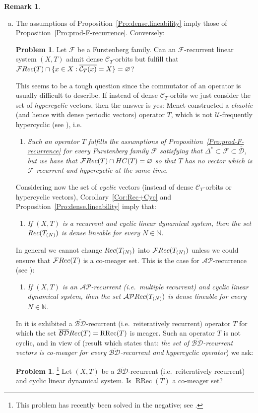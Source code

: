 \documentclass[openright,11pt]{article}
\theoremstyle{plain}
\theoremstyle{definition}
\newtheorem{remark}[theorem]{Remark}
\newtheorem{problem}[theorem]{Problem}
\newcommand{\NN}{\mathbb{N}}
\newcommand{\AP}{\mathcal{AP}}
\newcommand{\Fc}{\mathcal{F}}
\newcommand{\Uc}{\mathcal{U}}
\newcommand{\RRec}{\operatorname{RRec}}
\newcommand{\Rec}{\textup{Rec}}
\newcommand{\HC}{\textup{HC}}
\newcommand{\Com}{\mathcal{C}}
\newcommand{\cl}{\overline}
\newcommand{\BDsup}{\overline{\mathcal{BD}}}
\newcommand{\Dsup}{\overline{\mathcal{D}}}
\begin{document}
\begin{remark}
\begin{enumerate}[(a)]
		\item The assumptions of Proposition~\ref{Pro:dense.lineability} imply those of Proposition~\ref{Pro:prod-F-recurrence}. Conversely:
		\begin{problem}
			Let $\Fc$ be a Furstenberg family. Can an $\Fc$-recurrent linear system $(X,T)$ admit dense $\Com_T$-orbits but fulfill that $\Fc\Rec(T) \cap \{ x \in X : \cl{\Com_T(x)} = X \} = \varnothing$?
		\end{problem}
		This seems to be a tough question since the commutator of an operator is usually difficult to describe. If instead of dense $\Com_T$-orbits we just consider the set of {\em hypercyclic} vectors, then the answer is yes: Menet constructed a {\em chaotic} (and hence with dense periodic vectors) operator $T$, which is not $\Uc$-frequently hypercyclic (see \cite{Menet2017}), i.e.
		\begin{enumerate}[--]
			\item {\em Such an operator $T$ fulfills the assumptions of Proposition~\ref{Pro:prod-F-recurrence} for every Furstenberg family $\Fc$ satisfying that $\Delta^* \subset \Fc \subset \Dsup$, but we have that $\Fc\Rec(T) \cap \HC(T) = \varnothing$ so that $T$ has no vector which is $\Fc$-recurrent and hypercyclic at the same time}.
		\end{enumerate}
		Considering now the set of {\em cyclic} vectors (instead of dense $\Com_T$-orbits or hypercyclic vectors), Corollary~\ref{Cor:Rec+Cyc} and Proposition~\ref{Pro:dense.lineability} imply that:
		\begin{enumerate}[--]
			\item {\em If $(X,T)$ is a recurrent and cyclic linear dynamical system, then the set $\Rec(T_{(N)})$ is dense lineable for every $N \in \NN$}.
		\end{enumerate}
		In general we cannot change $\Rec(T_{(N)})$ into $\Fc\Rec(T_{(N)})$ unless we could ensure that $\Fc\Rec(T)$ is a co-meager set. This is the case for $\AP$-recurrence (see \cite{KwiLiOpYe2017,CarMur2022_MS}):
		\begin{enumerate}[--]
			\item {\em If $(X,T)$ is an $\AP$-recurrent (i.e.\ multiple recurrent) and cyclic linear dynamical system, then the set $\AP\Rec(T_{(N)})$ is dense lineable for every $N \in \NN$}.
		\end{enumerate}		
		In \cite[Example~2.4]{BoGrLoPe2022} it is exhibited a $\BDsup$-recurrent (i.e.\ reiteratively recurrent) operator $T$ for which the set $\BDsup\Rec(T)=\RRec(T)$ is meager. Such an operator $T$ is not cyclic, and in view of \cite[Theorem~2.1]{BoGrLoPe2022} (result which states that: {\em the set of $\BDsup$-recurrent vectors is co-meager for every $\BDsup$-recurrent and hypercyclic operator}) we ask:
		\begin{problem}\footnote{This problem has recently been solved in the negative; see \cite{LoMe2024_JMAA}.}
				Let $(X,T)$ be a $\BDsup$-recurrent (i.e.\ reiteratively recurrent) and cyclic linear dynamical system. Is $\RRec(T)$ a co-meager set?
		\end{problem}
	\end{enumerate}
\end{remark}
\end{document}
